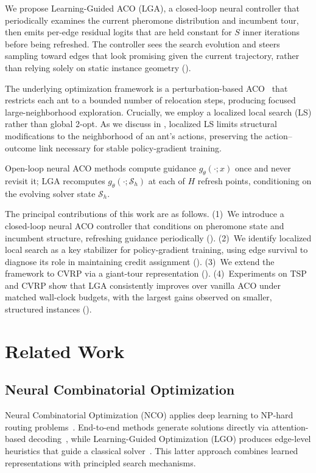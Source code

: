 \documentclass[sigconf,anonymous,review]{acmart}
\theoremstyle{definition}
\theoremstyle{plain}
\newcommand{\LGA}{\textsc{LGA}}
\begin{document}
We propose Learning-Guided ACO (\LGA{}), a closed-loop neural controller that periodically examines the current pheromone distribution and incumbent tour, then emits per-edge residual logits that are held constant for $S$ inner iterations before being refreshed.
The controller sees the search evolution and steers sampling toward edges that look promising given the current trajectory, rather than relying solely on static instance geometry ().

The underlying optimization framework is a perturbation-based ACO~\cite{faco} that restricts each ant to a bounded number of relocation steps, producing focused large-neighborhood exploration.
Crucially, we employ a localized local search (LS) rather than global 2-opt.
As we discuss in , localized LS limits structural modifications to the neighborhood of an ant's actions, preserving the action--outcome link necessary for stable policy-gradient training.

Open-loop neural ACO methods compute guidance $g_\theta(\cdot; x)$ once and never revisit it; \LGA{} recomputes $g_\theta(\cdot; \mathcal{S}_h)$ at each of $H$ refresh points, conditioning on the evolving solver state $\mathcal{S}_h$.

The principal contributions of this work are as follows.
(1)~We introduce a closed-loop neural ACO controller that conditions on pheromone state and incumbent structure, refreshing guidance periodically ().
(2)~We identify localized local search as a key stabilizer for policy-gradient training, using edge survival to diagnose its role in maintaining credit assignment ().
(3)~We extend the framework to CVRP via a giant-tour representation ().
(4)~Experiments on TSP and CVRP show that \LGA{} consistently improves over vanilla ACO under matched wall-clock budgets, with the largest gains observed on smaller, structured instances ().

\section{Related Work}
\subsection{Neural Combinatorial Optimization}
Neural Combinatorial Optimization (NCO) applies deep learning to NP-hard routing problems~\cite{MLCO}.
End-to-end methods generate solutions directly via attention-based decoding~\cite{pointernetwork,kool2019attention,kwon2020pomo}, while Learning-Guided Optimization (LGO) produces edge-level heuristics that guide a classical solver~\cite{RL4CO}. This latter approach combines learned representations with principled search mechanisms.
\end{document}
